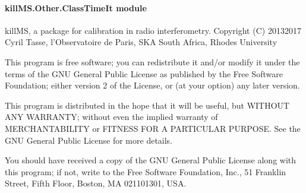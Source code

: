 \documentclass[letterpaper,10pt,english]{sphinxmanual}
\begin{document}
\paragraph{killMS.Other.ClassTimeIt module}
\label{\detokenize{api/killMS.Other:module-killMS.Other.ClassTimeIt}}\label{\detokenize{api/killMS.Other:killms-other-classtimeit-module}}
\sphinxAtStartPar
killMS, a package for calibration in radio interferometry.
Copyright (C) 2013\sphinxhyphen{}2017  Cyril Tasse, l’Observatoire de Paris,
SKA South Africa, Rhodes University

\sphinxAtStartPar
This program is free software; you can redistribute it and/or
modify it under the terms of the GNU General Public License
as published by the Free Software Foundation; either version 2
of the License, or (at your option) any later version.

\sphinxAtStartPar
This program is distributed in the hope that it will be useful,
but WITHOUT ANY WARRANTY; without even the implied warranty of
MERCHANTABILITY or FITNESS FOR A PARTICULAR PURPOSE.  See the
GNU General Public License for more details.

\sphinxAtStartPar
You should have received a copy of the GNU General Public License
along with this program; if not, write to the Free Software
Foundation, Inc., 51 Franklin Street, Fifth Floor, Boston, MA  02110\sphinxhyphen{}1301, USA.
\end{document}

